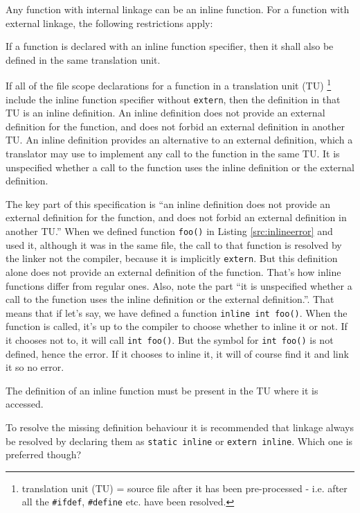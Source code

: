\documentclass[a4paper]{article}
\begin{document}
\begin{myquote}
Any function with internal linkage can be an inline function. For a function with external linkage, the following restrictions apply: 

If a function is declared with an inline function specifier, then it shall also be defined in the same translation unit.

If all of the file scope declarations for a function in a translation unit (TU) \footnote{translation unit (TU) = source file after it has been pre-processed - i.e. after all the \texttt{\#ifdef}, \texttt{\#define} etc. have been resolved.} include the inline function specifier without \texttt{extern}, then the definition in that TU is an inline definition. An inline definition does not provide an external definition for the function, and does not forbid an external definition in another TU. An inline definition provides an alternative to an external definition, which a translator may use to implement any call to the function in the same TU. It is unspecified whether a call to the function uses the inline definition or the external definition.\end{myquote}

The key part of this specification is ``an inline definition does not provide an external definition for the function, and does not forbid an external definition in another TU.'' When we defined function \texttt{foo()} in Listing \ref{src:inlineerror} and used it, although it was in the same file, the call to that function is resolved by the linker not the compiler, because it is implicitly \texttt{extern}. But this definition alone does not provide an external definition of the function. That's how inline functions differ from regular ones. 
Also, note the part ``it is unspecified whether a call to the function uses the inline definition or the external definition.''. That means that if let's say, we have defined a function \texttt{inline int foo()}. When the function is called, it's up to the compiler to choose whether to inline it or not. If it chooses not to, it will call \texttt{int foo()}. But the symbol for \texttt{int foo()} is not defined, hence the error. If it chooses to inline it, it will of course find it and link it so no error.
\begin{takeaway}
The definition of an inline function must be present in the TU where it is accessed.
\end{takeaway}
To resolve the missing definition behaviour it is recommended that linkage  always be resolved by declaring them as \texttt{static inline} or \texttt{extern inline}. Which one is preferred though?
\end{document}
